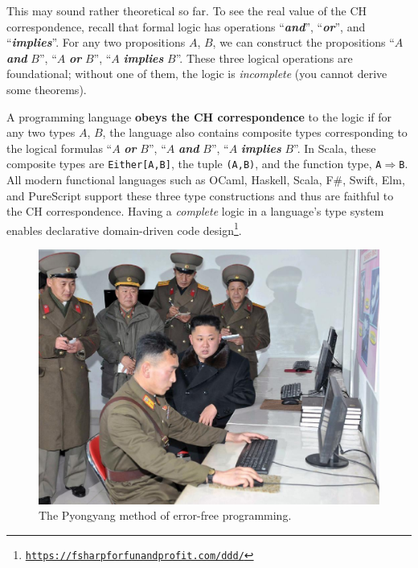 This may sound rather theoretical so far. To see the real value of
the CH correspondence, recall that formal logic has operations ``\textbf{\emph{and}}'',
``\textbf{\emph{or}}'', and ``\textbf{\emph{implies}}''. For any
two propositions $A$, $B$, we can construct the propositions ``$A$
\textbf{\emph{and}} $B$'', ``$A$ \textbf{\emph{or}} $B$'', ``$A$
\textbf{\emph{implies}} $B$''. These three logical operations are
foundational; without one of them, the logic is \emph{incomplete}
(you cannot derive some theorems).

A programming language \textbf{obeys the CH correspondence}
to the logic if for any two types $A$, $B$, the language also contains
composite types corresponding to the logical formulas ``$A$ \textbf{\emph{or}}
$B$'', ``$A$ \textbf{\emph{and}} $B$'', ``$A$ \textbf{\emph{implies}}
$B$''. In Scala, these composite types are \texttt{Either{[}A,B{]}},
the tuple \texttt{(A,B)}, and the function type, \texttt{A$\Rightarrow$B}.
All modern functional languages such as OCaml, Haskell, Scala, F\#,
Swift, Elm, and PureScript support these three type constructions
and thus are faithful to the CH correspondence. Having a \emph{complete}
logic in a language's type system enables declarative domain-driven
code design\footnote{\texttt{\href{https://fsharpforfunandprofit.com/ddd/}{https://fsharpforfunandprofit.com/ddd/}}}.

\begin{figure}%
\begin{centering}
\vspace{-0.5\baselineskip}
\includegraphics[width=1\linewidth]{no-bugs}\vspace{-0.5\baselineskip}
\par\end{centering}
\caption{The Pyongyang method of error-free programming.\label{fig:The-Pyongyang-method-of-error-free-programming}}
\vspace{-3\baselineskip}
\end{figure}%

